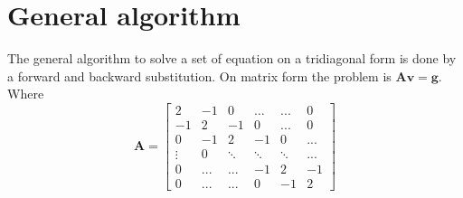 \documentclass[10pt]{article}
\begin{document}
 \section{General algorithm}
 The general algorithm to solve a set of equation on a tridiagonal form is done by a forward and backward substitution. On matrix form the problem is $\mathbf{A}\mathbf{v}=\mathbf{g}$. Where 
 $$
 \mathbf{A}=  \begin{bmatrix}
  2 & -1 & 0 & \dots & ... & 0 \\
  -1 & 2 & -1 & 0 & ... & 0 \\
  0  & -1 & 2 & -1 & 0 & ... \\
  \vdots & 0 & \ddots & \ddots & \ddots & ...\\
  0 & ... & ... & -1 & 2 & -1\\
  0 & ... & ... & 0 & -1 & 2 
 \end{bmatrix}
 $$
\end{document}
